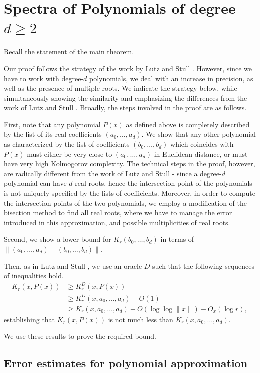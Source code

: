\documentclass[a4paper,UKenglish,cleveref,autoref,thm-restate]{lipics-v2021}
\begin{document}
\section{Spectra of Polynomials of degree $d\ge2$}
Recall the statement of the main theorem. 

\maintheorem*

Our proof follows the strategy of the work by Lutz and Stull \cite{Stull2020}. However, since we have to work with degree-$d$ polynomials, we deal with an increase in precision, as well as the presence of multiple roots. We indicate the strategy below, while simultaneously showing the similarity and emphasizing the differences from the work of Lutz and Stull \cite{Stull2020}. Broadly, the steps involved in the proof are as follows.

First, note that any polynomial $P(x)$ as defined above is completely described by the list of its real coefficients $(a_0,\dots,a_d)$. We show that any other polynomial as characterized by the list of coefficients $(b_0,\dots,b_d)$ which coincides with $P(x)$ must either be very close to $(a_0,\dots,a_d)$ in Euclidean distance, or must have very high Kolmogorov complexity. The technical steps in the proof, however, are radically different from the work of Lutz and Stull - since a degree-$d$ polynomial can have $d$ real roots, hence the intersection point of the polynomials is not uniquely specified by the lists of coefficients. Moreover, in order to compute the intersection points of the two polynomials, we employ a modification of the bisection method to find all real roots, where we have to manage the error introduced in this approximation, and possible multiplicities of real roots. 

Second, we show a lower bound for $K_r(b_0,\dots,b_d)$ in terms of $\|(a_0,\dots,a_d)-(b_0,\dots,b_d)\|$. 

Then, as in Lutz and Stull \cite{Stull2020}, we use an oracle $D$ such that the following sequences of inequalities hold.
\begin{align*}
K_r(x,P(x))
&\ge K^D_r(x,P(x))\\
&\ge K^D_r(x,a_0,\dots,a_d)-O(1)\\
&\ge K_r(x,a_0,\dots,a_d)-O(\log \log\|x\|)-O_x(\log r),
\end{align*}
establishing that $K_r(x,P(x))$ is not much less than
$K_r(x,a_0,\dots,a_d)$. 

We use these results to prove the required bound.

\subsection{Error estimates for polynomial approximation}
\end{document}
